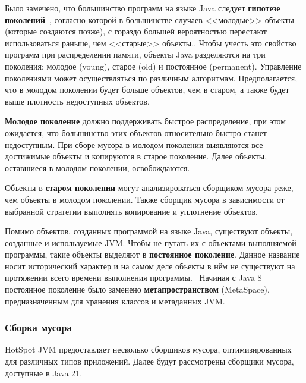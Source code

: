 Было замечено, что большинство программ на языке Java следует \textbf{гипотезе поколений}~\cite{handbook}, согласно которой в большинстве случаев <<молодые>> объекты (которые создаются позже), с гораздо большей вероятностью перестают использоваться раньше, чем <<старые>> объекты.. Чтобы учесть это свойство программ при распределении памяти, объекты Java разделяются на три поколения: молодое (young), старое (old) и постоянное (permanent). Управление поколениями может осуществляться по различным алгоритмам. Предполагается, что в молодом поколении будет больше объектов, чем в старом, а также будет выше плотность недоступных объектов.~\cite{java_storage_management}

\textbf{Молодое поколение} должно поддерживать быстрое распределение, при этом ожидается, что большинство этих объектов относительно быстро станет недоступным. При сборе мусора в молодом поколении выявляются все достижимые объекты и копируются в старое поколение. Далее объекты, оставшиеся в молодом поколении, освобождаются.~\cite{java_storage_management}

Объекты в \textbf{старом поколении} могут анализироваться сборщиком мусора реже, чем объекты в молодом поколении. Также сборщик мусора в зависимости от выбранной стратегии выполнять копирование и уплотнение объектов.~\cite{java_storage_management}~\cite{java_memory}

Помимо объектов, созданных программой на языке Java, существуют объекты, созданные и используемые JVM. Чтобы не путать их с объектами выполняемой программы, такие объекты выделяют в \textbf{постоянное поколение}. Данное название носит исторический характер и на самом деле объекты в нём не существуют на протяжении всего времени выполнения программы.~\cite{java_storage_management} Начиная с Java 8 постоянное поколение было заменено \textbf{метапространством} (MetaSpace), предназначенным для хранения классов и метаданных JVM.~\cite{java_presentation}

\subsubsection{Сборка мусора}

HotSpot JVM предоставляет несколько сборщиков мусора, оптимизированных для различных типов приложений. Далее будут рассмотрены сборщики мусора, доступные в Java 21.~\cite{java_21_available_collectors}

